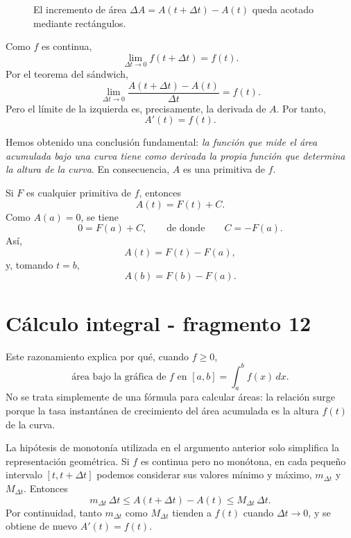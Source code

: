 \begin{figure}[htbp]
\centering
{}
\caption{El incremento de área $\Delta A=A(t+\Delta t)-A(t)$ queda acotado mediante rectángulos.}

\end{figure}

Como $f$ es continua,
\[
\lim_{\Delta t\to0}f(t+\Delta t)=f(t).
\]
Por el teorema del sándwich,
\[
\lim_{\Delta t\to0}
\frac{A(t+\Delta t)-A(t)}{\Delta t}
=f(t).
\]
Pero el límite de la izquierda es, precisamente, la derivada de $A$. Por tanto,
\[
\boxed{A'(t)=f(t).}
\]

Hemos obtenido una conclusión fundamental: \emph{la función que mide el área acumulada bajo una curva tiene como derivada la propia función que determina la altura de la curva}. En consecuencia, $A$ es una primitiva de $f$.

Si $F$ es cualquier primitiva de $f$, entonces
\[
A(t)=F(t)+C.
\]
Como $A(a)=0$, se tiene
\[
0=F(a)+C,
\qquad\text{de donde}\qquad
C=-F(a).
\]
Así,
\[
A(t)=F(t)-F(a),
\]
y, tomando $t=b$,
\[
\boxed{A(b)=F(b)-F(a).}
\]


\section{Cálculo integral - fragmento 12}
Este razonamiento explica por qué, cuando $f\geq0$,
\[
\boxed{\text{área bajo la gráfica de $f$ en $[a,b]$}=\int_a^b f(x)\,dx.}
\]
No se trata simplemente de una fórmula para calcular áreas: la relación surge porque la tasa instantánea de crecimiento del área acumulada es la altura $f(t)$ de la curva.

La hipótesis de monotonía utilizada en el argumento anterior solo simplifica la representación geométrica. Si $f$ es continua pero no monótona, en cada pequeño intervalo $[t,t+\Delta t]$ podemos considerar sus valores mínimo y máximo, $m_{\Delta t}$ y $M_{\Delta t}$. Entonces
\[
m_{\Delta t}\,\Delta t
\leq
A(t+\Delta t)-A(t)
\leq
M_{\Delta t}\,\Delta t.
\]
Por continuidad, tanto $m_{\Delta t}$ como $M_{\Delta t}$ tienden a $f(t)$ cuando $\Delta t\to0$, y se obtiene de nuevo $A'(t)=f(t)$.


